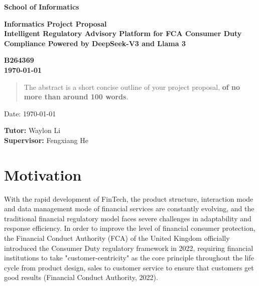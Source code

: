 \documentclass[a4paper,11pt]{article}
\newcommand{\examnumber}{B264369}
\newcommand{\field}{Intelligent Regulatory Advisory Platform for FCA Consumer Duty Compliance Powered by DeepSeek-V3 and Llama 3}
\newcommand{\tutor}{Waylon Li}
\newcommand{\supervisor}{Fengxiang He}
\begin{document}
\begin{minipage}[b]{110mm}
        {\Huge\bf School of Informatics
        \vspace*{17mm}}
\end{minipage}
\hfill
\begin{minipage}[t]{40mm}               
\end{minipage}
\par\noindent
\vspace*{2cm}
\begin{center}
        \Large\bf Informatics Project Proposal \\
        \Large\bf \field
\end{center}
\vspace*{1.5cm}
\begin{center}
        \bf \examnumber\\
        \monthyeardate\today
\end{center}
\vspace*{5mm}

%
%                       
\begin{abstract}
        The abstract is a short concise outline of your 
        project proposal, {\bf of no more than around 100 words}.
\end{abstract}

\vspace*{1cm}

\vspace*{3cm}
Date: \today

\vfill
{\bf Tutor:} \tutor\\
{\bf Supervisor:} \supervisor
\newpage

%


\section{Motivation}

With the rapid development of FinTech, the product structure, interaction mode and data management mode of financial services are constantly evolving, and the traditional financial regulatory model faces severe challenges in adaptability and response efficiency. In order to improve the level of financial consumer protection, the Financial Conduct Authority (FCA) of the United Kingdom officially introduced the Consumer Duty regulatory framework in 2022, requiring financial institutions to take "customer-centricity" as the core principle throughout the life cycle from product design, sales to customer service to ensure that customers get good results (Financial Conduct Authority, 2022).
\end{document}
